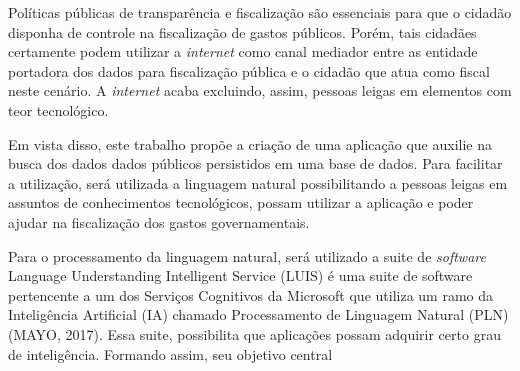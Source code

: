 Políticas públicas de transparência e fiscalização são essenciais para que o cidadão disponha de controle na fiscalização de gastos públicos. Porém, tais cidadães certamente podem utilizar a \textit{internet} como canal mediador entre as entidade portadora dos dados para fiscalização pública e o cidadão que atua como fiscal neste cenário. A \textit{internet} acaba excluindo, assim, pessoas leigas em elementos com teor tecnológico.

Em vista disso, este trabalho propõe a criação de uma aplicação que auxilie na busca dos dados dados públicos persistidos em uma base de dados. Para facilitar a utilização, será utilizada a linguagem natural possibilitando a pessoas leigas em assuntos de conhecimentos tecnológicos, possam utilizar a aplicação e poder ajudar na fiscalização dos gastos governamentais.

Para o processamento da linguagem natural, será utilizado a suite de \textit{software} Language Understanding Intelligent Service (LUIS) é uma suite de software pertencente a um dos Serviços Cognitivos da Microsoft que utiliza um ramo da Inteligência Artificial (IA) chamado Processamento de Linguagem Natural (PLN) (MAYO, 2017). Essa suite, possibilita que aplicações possam adquirir certo grau de inteligência. Formando assim, seu objetivo central
